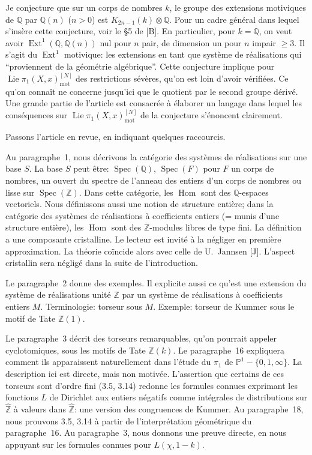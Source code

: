 \documentclass[12pt,a4paper]{article}
\theoremstyle{plain}
\theoremstyle{definition}
\theoremstyle{remark}
\DeclareMathOperator{\Spec}{Spec}
\DeclareMathOperator{\Hom}{Hom}
\DeclareMathOperator{\Ext}{Ext}
\DeclareMathOperator{\Lie}{Lie}
\newcommand{\mot}{\mathrm{mot}}
\providecommand{\Hom}{\operatorname{Hom}}
\providecommand{\Ext}{\operatorname{Ext}}
\providecommand{\Spec}{\operatorname{Spec}}
\providecommand{\mot}{\mathrm{mot}}
\providecommand{\Lie}{\operatorname{Lie}}
\begin{document}
Je conjecture que sur un corps de nombres $k$, le groupe des extensions motiviques de
$\mathbb{Q}$ par $\mathbb{Q}(n)$ ($n > 0$) est $K_{2n-1}(k) \otimes \mathbb{Q}$. Pour un cadre
g\'en\'eral dans lequel s'ins\`ere cette conjecture, voir le \S5 de [B]. En particulier, pour
$k = \mathbb{Q}$, on veut avoir $\Ext^1(\mathbb{Q}, \mathbb{Q}(n))$ nul pour $n$ pair, de dimension
un pour $n$ impair $\geq 3$. Il s'agit du $\Ext^1$ motivique: les extensions en tant que
syst\`eme de r\'ealisations qui ``proviennent de la g\'eom\'etrie alg\'ebrique''. Cette conjecture
implique pour $\Lie\pi_1(X,x)^{[N]}_{\mot}$ des restrictions s\'ev\`eres, qu'on est loin d'avoir
v\'erifi\'ees. Ce qu'on conna\^it ne concerne jusqu'ici que le quotient par le second groupe
d\'eriv\'e. Une grande partie de l'article est consacr\'ee \`a \'elaborer un langage dans lequel
les cons\'equences sur $\Lie\pi_1(X,x)^{[N]}_{\mot}$ de la conjecture s'\'enoncent clairement.

Passons l'article en revue, en indiquant quelques raccourcis.

Au paragraphe~1, nous d\'ecrivons la cat\'egorie des syst\`emes de r\'ealisations sur une
base $S$. La base $S$ peut \^etre: $\Spec(\mathbb{Q})$, $\Spec(F)$ pour $F$ un corps de nombres,
un ouvert du spectre de l'anneau des entiers d'un corps de nombres ou lisse sur $\Spec(\mathbb{Z})$.
Dans cette cat\'egorie, les $\Hom$ sont des $\mathbb{Q}$-espaces vectoriels. Nous d\'efinissons aussi
une notion de structure enti\`ere; dans la cat\'egorie des syst\`emes de r\'ealisations \`a
coefficients entiers (= munis d'une structure enti\`ere), les $\Hom$ sont des $\mathbb{Z}$-modules
libres de type fini. La d\'efinition a une composante cristalline. Le lecteur est invit\'e
\`a la n\'egliger en premi\`ere approximation. La th\'eorie coïncide alors avec celle de U.~Jannsen [J]. L'aspect cristallin sera n\'eglig\'e dans la suite de l'introduction.

Le paragraphe~2 donne des exemples. Il explicite aussi ce qu'est une extension du
syst\`eme de r\'ealisations unit\'e $\mathbb{Z}$ par un syst\`eme de r\'ealisations \`a
coefficients entiers $M$. Terminologie: torseur sous $M$. Exemple: torseur de Kummer
sous le motif de Tate $\mathbb{Z}(1)$.

Le paragraphe~3 d\'ecrit des torseurs remarquables, qu'on pourrait appeler cyclotomiques,
sous les motifs de Tate $\mathbb{Z}(k)$. Le paragraphe~16 expliquera comment ils apparaissent
naturellement dans l'\'etude du $\pi_1$ de $\mathbb{P}^1 - \{0,1,\infty\}$. La description
ici est directe, mais non motiv\'ee. L'assertion que certains de ces torseurs sont d'ordre
fini (3.5, 3.14) redonne les formules connues exprimant les fonctions $L$ de Dirichlet aux
entiers n\'egatifs comme int\'egrales de distributions sur $\hat{\mathbb{Z}}$ \`a valeurs dans
$\hat{\mathbb{Z}}$: une version des congruences de Kummer. Au paragraphe~18, nous prouvons
3.5, 3.14 \`a partir de l'interpr\'etation g\'eom\'etrique du paragraphe~16. Au paragraphe~3,
nous donnons une preuve directe, en nous appuyant sur les formules connues pour
$L(\chi, 1-k)$.
\end{document}
